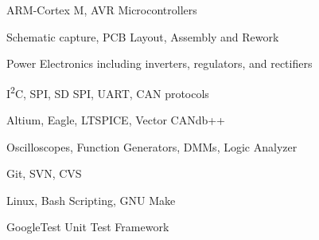 \begin{cvskillscolumn}

                {\item ARM-Cortex M, AVR Microcontrollers
                 \item Schematic capture, PCB Layout, Assembly and Rework
                 \item Power Electronics including inverters, regulators, and rectifiers
                 \item I\textsuperscript{2}C, SPI, SD SPI, UART, CAN protocols}
                {\item Altium, Eagle, LTSPICE, Vector CANdb++
                 \item Oscilloscopes, Function Generators, DMMs, Logic Analyzer
                 \item Git, SVN, CVS
                 \item Linux, Bash Scripting, GNU Make
                 \item GoogleTest Unit Test Framework}
\end{cvskillscolumn}
